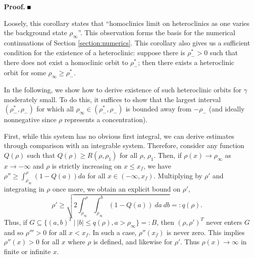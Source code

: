 \documentclass[10pt]{article}
\newenvironment{Proof}%
 {\begin{trivlist} \item[]{\bf Proof. }}%
 {\hspace*{\fill}$\rule{.4\baselineskip}{.4\baselineskip}$\end{trivlist}}
\renewcommand{\leq}{\leqslant}
\renewcommand{\geq}{\geqslant}
\begin{document}
\begin{Proof}
% 
% 
\end{Proof}

Loosely, this corollary states that ``homoclinics limit on heteroclinics as one varies the background state $\rho_\infty$''.  This observation forms the basis for the numerical continuations of Section \ref{section:numerics}.  This corollary also gives us a sufficient condition for the existence of a heteroclinic: suppose  there is $\rho_-^*>0$ such that there does not exist a homoclinic orbit to $\rho_-^*$; then there exists a heteroclinic orbit for some $\rho_\infty\geq\rho_-^*$. 

In the following, we show how to derive existence of such heteroclinic orbits for $\gamma$ moderately small. To do this, it suffices to show that the largest interval $(\rho_-^*,\rho_-)$ for which all $\rho_\infty \in (\rho_-^*,\rho_-)$ is bounded away from $-\rho_-$ (and ideally nonnegative  since $\rho$ represents a concentration).

First, while this system has no obvious first integral, we can derive estimates through comparison with an integrable system.  Therefore, consider any function $Q(\rho)$ such that $Q(\rho) \geq R(\rho,\rho_1)$ for all $\rho$, $\rho_1$.  Then, if $\rho(x) \to \rho_\infty$ as $x \to -\infty$ and $\rho$ is strictly increasing on $x\leq x_f$, we have $\rho'' \geq \int_{\rho_\infty}^{\rho} (1-Q(a))da$ for all $x \in (-\infty,x_f)$. Multiplying by $\rho'$ and integrating in $\rho$ once more, we obtain an explicit bound on $\rho'$,
\begin{equation}
\rho' \geq \sqrt{2{\int_{\rho_\infty}^{\rho}\int_{\rho_\infty}^{b} (1-Q(a))\ da\ db}} =: q(\rho).
\end{equation}
Thus, if $G \subseteq \{(a,b)^T \ | \ |b| \leq q(\rho), a >\rho_\infty\}=:B$, then $(\rho,\rho')^T$ never enters $G$ and so $\rho''' >0$ for all $x < x_f$.  In such a case, $\rho''(x_f)$ is never zero.  This implies $\rho''(x) >0$ for all $x$ where $\rho$ is defined, and likewise for $\rho'$.  Thus $\rho(x) \to \infty$ in finite or infinite $x$.
\end{document}
